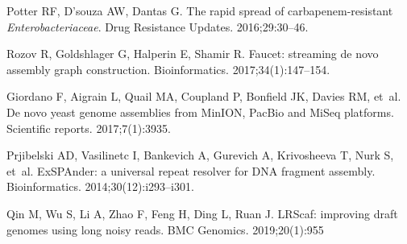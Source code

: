 \documentclass[10pt,letterpaper]{article}
\begin{document}
\begin{thebibliography}{10}
Potter RF, D’souza AW, Dantas G.
\newblock The rapid spread of carbapenem-resistant \emph{Enterobacteriaceae}.
\newblock Drug Resistance Updates. 2016;29:30--46.

Rozov R, Goldshlager G, Halperin E, Shamir R.
\newblock Faucet: streaming de novo assembly graph construction.
\newblock Bioinformatics. 2017;34(1):147--154.

Giordano F, Aigrain L, Quail MA, Coupland P, Bonfield JK, Davies RM, et~al.
\newblock De novo yeast genome assemblies from MinION, PacBio and MiSeq platforms.
\newblock Scientific reports. 2017;7(1):3935.

Prjibelski AD, Vasilinetc I, Bankevich A, Gurevich A, Krivosheeva T, Nurk S,
  et~al.
\newblock ExSPAnder: a universal repeat resolver for DNA fragment assembly.
\newblock Bioinformatics. 2014;30(12):i293--i301.

Qin M, Wu S, Li A, Zhao F, Feng H, Ding L, Ruan J.
\newblock LRScaf: improving draft genomes using long noisy reads.
\newblock BMC Genomics. 2019;20(1):955


\end{thebibliography}
\end{document}
